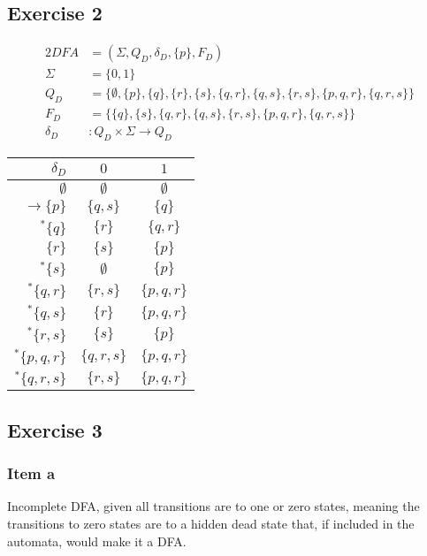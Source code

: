 \documentclass[docid=TP03]{tcom_TP}
\begin{document}
{\subsection{Exercise 2}
\label{subsec:03_02}
\begin{alignat*}{2}
	DFA       &= (\Sigma, Q_D, \delta_D, \{p\}, F_D)\\
	\Sigma    &= \{0,1\}\\
	Q_D       &= \{\emptyset,\{p\},\{q\},\{r\},\{s\},\{q,r\},\{q,s\},\{r,s\},\{p,q,r\},\{q,r,s\}\}\\
	F_D       &= \{\{q\},\{s\},\{q,r\},\{q,s\},\{r,s\},\{p,q,r\},\{q,r,s\}\}\\
	\delta_D &\colon Q_D \times \Sigma \rightarrow Q_D
\end{alignat*}
\begin{center}
\begin{tabular}{ r | c c }
 $\delta_D$ & $0$ & $1$ \\
 \hline
 $\emptyset              $ & $\emptyset  $ & $\emptyset  $ \\
 $\rightarrow \{p      \}$ & $\{  q,  s\}$ & $\{  q    \}$ \\  
 $^*       \{  q    \}$ & $\{    r  \}$ & $\{  q,r  \}$ \\
 $            \{    r  \}$ & $\{      s\}$ & $\{p      \}$ \\
 $^*       \{      s\}$ & $\emptyset  $ & $\{p      \}$ \\
 $^*       \{  q,r  \}$ & $\{    r,s\}$ & $\{p,q,r  \}$ \\
 $^*       \{  q,  s\}$ & $\{    r  \}$ & $\{p,q,r  \}$ \\
 $^*       \{    r,s\}$ & $\{      s\}$ & $\{p      \}$ \\
 $^*       \{p,q,r  \}$ & $\{  q,r,s\}$ & $\{p,q,r  \}$ \\
 $^*       \{  q,r,s\}$ & $\{    r,s\}$ & $\{p,q,r  \}$
\end{tabular}
\end{center}
\subsection{Exercise 3} \label{subsec:03_03}
\subsubsection{Item a}
Incomplete DFA, given all transitions are to one or zero states, meaning the transitions to zero states are to a hidden dead state that, if included in the automata, would make it a DFA.
}
\end{document}

